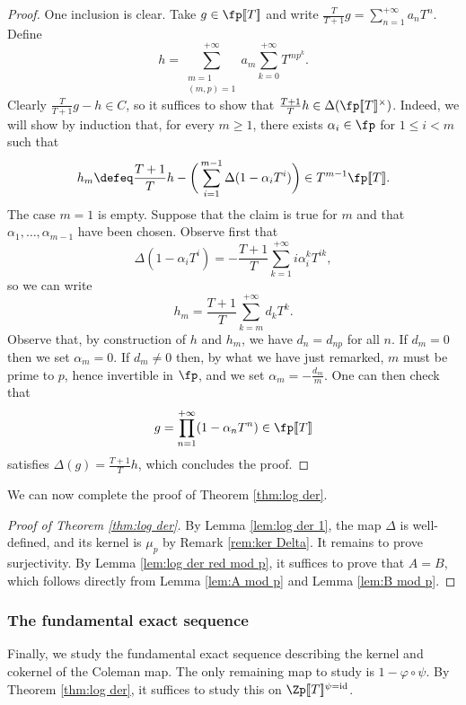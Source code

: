 \documentclass[a4paper,10pt, english, reqno]{smfart}
\newcommand{\lsem}{[\! [}
\newcommand{\rsem}{]\! ]}
\numberwithin{equation}{section}
\begin{document}
\begin{proof}
	One inclusion is clear. Take $g \in \fp\lsem T\rsem $ and write $\frac{T}{T + 1} g = \sum_{n = 1}^{+ \infty} a_n T^n$. Define
	\[ h = \sum_{\substack{m = 1 \\ (m, p) = 1}}^{+\infty} a_m \sum_{k = 0}^{+\infty} T^{m p^k}. \] Clearly $\frac{T}{T+1} g - h \in C$, so it suffices to show that $\frac{T + 1}{T} h \in \Delta(\fp\lsem T\rsem ^\times)$.
	Indeed, we will show by induction that, for every $m \geq 1$, there exists $\alpha_i \in \fp$ for $1 \leq i < m$ such that
	\[ h_m \defeq \frac{T + 1}{T} h - \bigg( \sum_{i = 1}^{m - 1} \Delta(1 - \alpha_i T^i) \bigg) \in T^{m-1} \fp\lsem T\rsem . \] The case $m = 1$ is empty. Suppose that the claim is true for $m$ and that $\alpha_1, \hdots, \alpha_{m - 1}$ have been chosen. Observe first that
	\[ \Delta(1 - \alpha_i T^i) =  - \frac{T + 1}{T} \sum_{k = 1}^{+\infty} i \alpha_i^k T^{ik}, \] so we can write 
	\[ h_m = \frac{T + 1}{T} \sum_{k = m}^{+ \infty} d_k T^k. \] Observe that, by construction of $h$ and $h_m$, we have $d_n = d_{np}$ for all $n$. If $d_m = 0$ then we set $\alpha_m = 0$. If $d_m \neq 0$ then, by what we have just remarked, $m$ must be prime to $p$, hence invertible in $\fp$, and we set $\alpha_m = - \frac{d_m}{m}$. One can then check that
	\[ g = \prod_{n = 1}^{+\infty} (1 - \alpha_n T^n) \in \fp\lsem T\rsem  \] satisfies $\Delta(g) = \frac{T + 1}{T} h$, which concludes the proof.
\end{proof}

We can now complete the proof of  Theorem \ref{thm:log der}. 

\begin{proof} [{Proof of Theorem \ref{thm:log der}}]
By Lemma \ref{lem:log der 1}, the map $\Delta$ is well-defined, and its kernel is $\mu_p$ by Remark \ref{rem:ker Delta}. It remains to prove surjectivity. By Lemma \ref{lem:log der red mod p}, it suffices to prove that $A = B$, which follows directly from Lemma \ref{lem:A mod p} and Lemma \ref{lem:B mod p}.
\end{proof}


\subsubsection{The fundamental exact sequence}


Finally, we study the fundamental exact sequence describing the kernel and cokernel of the Coleman map. The only remaining map to study is $1-\varphi\circ\psi$. By Theorem \ref{thm:log der}, it suffices to study this on $\Zp\lsem T\rsem^{\psi=\mathrm{id}}$. 
\end{document}
